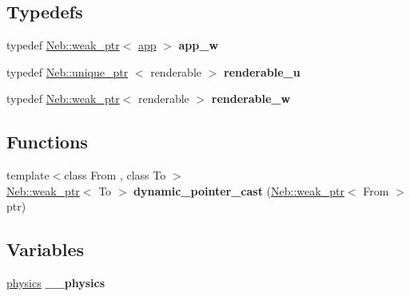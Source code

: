\subsection*{\-Typedefs}
\begin{DoxyCompactItemize}
\item 
\hypertarget{namespaceNeb_aa4fcad20cebfd0160ee2d0285a6fc129}{typedef \hyperlink{classNeb_1_1weak__ptr}{\-Neb\-::weak\-\_\-ptr}$<$ \hyperlink{classNeb_1_1app}{app} $>$ {\bfseries app\-\_\-w}}\label{namespaceNeb_aa4fcad20cebfd0160ee2d0285a6fc129}

\item 
\hypertarget{namespaceNeb_ae8d36138d23d3c479a601c88b3393b43}{typedef \hyperlink{classNeb_1_1unique__ptr}{\-Neb\-::unique\-\_\-ptr}\*
$<$ renderable $>$ {\bfseries renderable\-\_\-u}}\label{namespaceNeb_ae8d36138d23d3c479a601c88b3393b43}

\item 
\hypertarget{namespaceNeb_a0aac28857d44701417babbe71c47de0b}{typedef \hyperlink{classNeb_1_1weak__ptr}{\-Neb\-::weak\-\_\-ptr}$<$ renderable $>$ {\bfseries renderable\-\_\-w}}\label{namespaceNeb_a0aac28857d44701417babbe71c47de0b}

\end{DoxyCompactItemize}
\subsection*{\-Functions}
\begin{DoxyCompactItemize}
\item 
\hypertarget{namespaceNeb_a4ed152a7fe9e22a11580d60f1d14b2d2}{{\footnotesize template$<$class From , class To $>$ }\\\hyperlink{classNeb_1_1weak__ptr}{\-Neb\-::weak\-\_\-ptr}$<$ \-To $>$ {\bfseries dynamic\-\_\-pointer\-\_\-cast} (\hyperlink{classNeb_1_1weak__ptr}{\-Neb\-::weak\-\_\-ptr}$<$ \-From $>$ ptr)}\label{namespaceNeb_a4ed152a7fe9e22a11580d60f1d14b2d2}

\end{DoxyCompactItemize}
\subsection*{\-Variables}
\begin{DoxyCompactItemize}
\item 
\hypertarget{namespaceNeb_a16bff826fe3b967c09a5f37850d60ee5}{\hyperlink{classNeb_1_1physics}{physics} {\bfseries \-\_\-\-\_\-physics}}\label{namespaceNeb_a16bff826fe3b967c09a5f37850d60ee5}

\end{DoxyCompactItemize}


